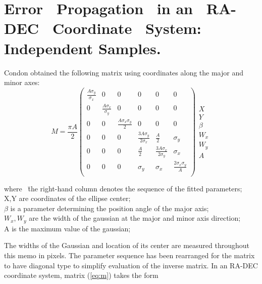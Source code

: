 \section{Error~ Propagation~  in an ~RA-DEC ~Coordinate ~System:
Independent Samples.}
Condon \cite{jjcon} obtained the following matrix using  coordinates
along the major and minor axes:
\begin{equation}
M = \frac{\pi A}{2}
\left(
\begin{array}{cccccc}
\frac{A\sigma_y}{\sigma_x} & 0 & 0 & 0 & 0 & 0 \\
0 & \frac{A\sigma_x}{\sigma_y} & 0 & 0 & 0 & 0 \\
0 & 0 & \frac{A\sigma_x\sigma_y}{2} & 0 & 0 & 0 \\
0 & 0 & 0 & \frac{3A\sigma_y}{2\sigma_x} & \frac{A}{2} & \sigma_y \\
0 & 0 & 0 & \frac{A}{2} & \frac{3A\sigma_x}{2\sigma_y} & \sigma_x \\
0 & 0 & 0 & \sigma_y & \sigma_x & \frac{2\sigma_x \sigma_y}{A} \\
\end{array}
\right)
\begin{array}{c}
X \\ Y \\ \beta \\ W_x \\ W_y \\ A
\end{array}
\label{eq:m}
\end{equation}
\begin{tabbing}
where~
\=the right-hand column denotes the sequence of the fitted parameters;\\
\> X,Y are coordinates of the ellipse center;\\
\> $\beta$ is a parameter determining the position angle of the major axis;\\
\> $W_x, W_y$ are the width of the gaussian at the major and minor axis direction;\\
\> A is the maximum value of the gaussian;
\end{tabbing}
The widths of the Gaussian and location of its center are measured
throughout this memo in pixels.  The parameter sequence has been
rearranged for the matrix to have diagonal type to simplify evaluation
of the inverse matrix.  In an RA-DEC coordinate system, matrix
(\ref{eq:m}) takes the form
